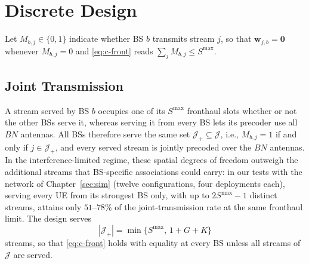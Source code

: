 \section{Discrete Design} \label{sec:algo_ahc}
Let $M_{b,j}\in\{0,1\}$ indicate whether BS $b$ transmits stream $j$, so that $\mathbf w_{j,b}=\mathbf 0$ whenever $M_{b,j}=0$ and \eqref{eq:c-front} reads $\sum_jM_{b,j}\le S^{\max}$.

\subsection{Joint Transmission}
A stream served by BS $b$ occupies one of its $S^{\max}$ fronthaul slots whether or not the other BSs serve it, whereas serving it from every BS lets its precoder use all $BN$ antennas. All BSs therefore serve the same set $\mathcal J_+\subseteq\mathcal J$, i.e., $M_{b,j}=1$ if and only if $j\in\mathcal J_+$, and every served stream is jointly precoded over the $BN$ antennas. In the interference-limited regime, these spatial degrees of freedom outweigh the additional streams that BS-specific associations could carry: in our tests with the network of Chapter~\ref{sec:sim} (twelve configurations, four deployments each), serving every UE from its strongest BS only, with up to $2S^{\max}-1$ distinct streams, attains only $51$--$78\%$ of the joint-transmission rate at the same fronthaul limit. The design serves
\begin{equation}\label{eq:full_fronthaul}
|\mathcal J_+|=\min\{S^{\max},\,1+G+K\}
\end{equation}
streams, so that \eqref{eq:c-front} holds with equality at every BS unless all streams of $\mathcal J$ are served.

